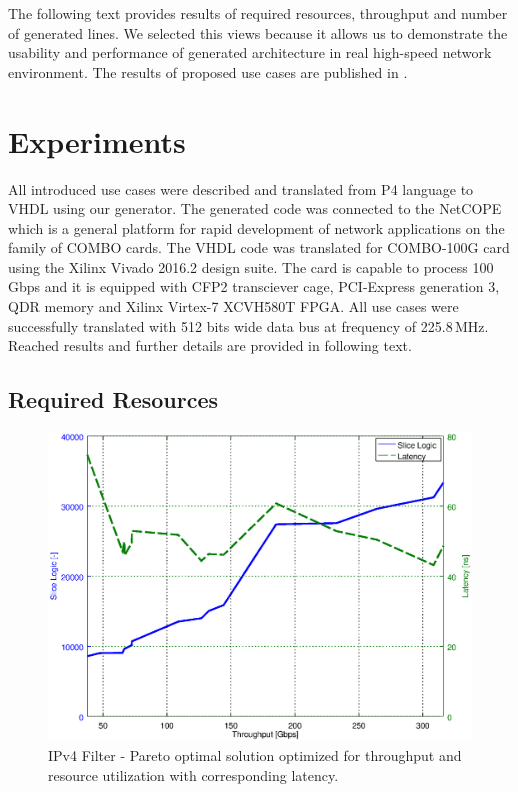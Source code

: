 The following text provides results of required resources, throughput and number of generated lines. 
We selected this views because it allows us to demonstrate the usability and performance of generated architecture 
in real high-speed network environment. The results of proposed use cases are published in 
\cite{2016h2rc-p4,2016MicproP4}.

\section{Experiments}
All introduced use cases were described and translated from P4 language to VHDL using our generator. The generated code was
connected to the NetCOPE \cite{NetCOPEWeb} which is a general platform for rapid development of network applications on 
the family of COMBO cards. The VHDL code was translated for COMBO-100G card \cite{combo-100g} using the Xilinx Vivado 2016.2 design suite. 
The card is capable to process 100\,Gbps and it is equipped with CFP2 transciever cage, PCI-Express generation 3, QDR memory and 
Xilinx Virtex-7 XCVH580T FPGA. 
All use cases were successfully translated with 512 bits wide data bus at frequency of 225.8\,MHz. 
Reached results and further details are provided in following text.

\subsection{Required Resources}

\begin{figure}[b]
    \centering
    \includegraphics[scale=0.61]{chapters/pic/graphs/p4-pipeline/thr_slice_logic_pareto_ipv4_latency}
    \caption{IPv4 Filter - Pareto optimal solution optimized for throughput and resource utilization with corresponding latency.}
    \label{fig:ipv4ParetoLatency}
\end{figure}

